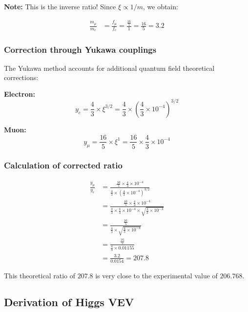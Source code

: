 \documentclass[12pt,a4paper]{article}
\begin{document}
\textbf{Note:} This is the inverse ratio! Since $\xi \propto 1/m$, we obtain:

\begin{align}
	\frac{m_\mu}{m_e} &= \frac{f_\mu}{f_e} = \frac{\frac{16}{5}}{1} = \frac{16}{5} = 3.2
\end{align}

\subsubsection{Correction through Yukawa couplings}

The Yukawa method accounts for additional quantum field theoretical corrections:

\textbf{Electron:}
\begin{equation}
	y_e = \frac{4}{3} \times \xi^{3/2} = \frac{4}{3} \times \left(\frac{4}{3} \times 10^{-4}\right)^{3/2}
\end{equation}

\textbf{Muon:}
\begin{equation}
	y_\mu = \frac{16}{5} \times \xi^1 = \frac{16}{5} \times \frac{4}{3} \times 10^{-4}
\end{equation}

\subsubsection{Calculation of corrected ratio}

\begin{align}
	\frac{y_\mu}{y_e} &= \frac{\frac{16}{5} \times \frac{4}{3} \times 10^{-4}}{\frac{4}{3} \times \left(\frac{4}{3} \times 10^{-4}\right)^{3/2}}\\
	&= \frac{\frac{16}{5} \times \frac{4}{3} \times 10^{-4}}{\frac{4}{3} \times \frac{4}{3} \times 10^{-4} \times \sqrt{\frac{4}{3} \times 10^{-4}}}\\
	&= \frac{\frac{16}{5}}{\frac{4}{3} \times \sqrt{\frac{4}{3} \times 10^{-4}}}\\
	&= \frac{\frac{16}{5}}{\frac{4}{3} \times 0.01155}\\
	&= \frac{3.2}{0.0154} = 207.8
\end{align}

This theoretical ratio of $207.8$ is very close to the experimental value of $206.768$.

\subsection{Derivation of Higgs VEV}
\end{document}
